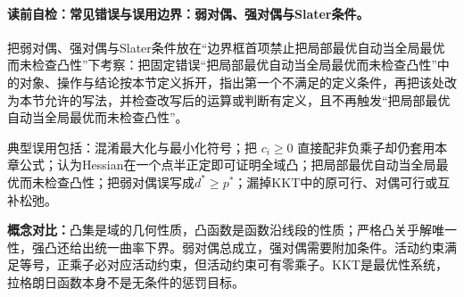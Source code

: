 \label{struct:V1-C07-CH32}
\paragraph{读前自检：常见错误与误用边界：弱对偶、强对偶与Slater条件。}把弱对偶、强对偶与Slater条件放在“边界框首项禁止把局部最优自动当全局最优而未检查凸性”下考察：把固定错误“把局部最优自动当全局最优而未检查凸性”中的对象、操作与结论按本节定义拆开，指出第一个不满足的定义条件，再把该处改为本节允许的写法，并检查改写后的运算或判断有定义，且不再触发“把局部最优自动当全局最优而未检查凸性”。\par

\begin{warningbox}
典型误用包括：混淆最大化与最小化符号；把 $c_i\ge0$ 直接配非负乘子却仍套用本章公式；认为Hessian在一个点半正定即可证明全域凸；把局部最优自动当全局最优而未检查凸性；把弱对偶误写成$d^*\ge p^*$；漏掉KKT中的原可行、对偶可行或互补松弛。
\end{warningbox}

\label{struct:V1-C07-CH33}
\begin{comparisonbox}
\textbf{概念对比：}凸集是域的几何性质，凸函数是函数沿线段的性质；严格凸关乎解唯一性，强凸还给出统一曲率下界。弱对偶总成立，强对偶需要附加条件。活动约束满足等号，正乘子必对应活动约束，但活动约束可有零乘子。KKT是最优性系统，拉格朗日函数本身不是无条件的惩罚目标。
\end{comparisonbox}

